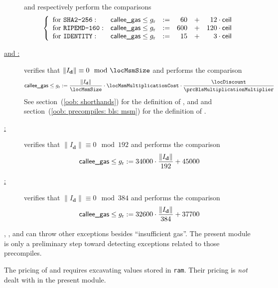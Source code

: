 \begin{description}
		and respectively perform the comparisons
		\[
			\left\{ \begin{array}{llcrcr}
				\text{for }\texttt{SHA2-256}   : & \textsf{callee\_gas} \leq g_\text{r} & := & 60  & + & 12  \cdot \textsf{ceil}  \\
				\text{for }\texttt{RIPEMD-160} : & \textsf{callee\_gas} \leq g_\text{r} & := & 600 & + & 120 \cdot \textsf{ceil}  \\
				\text{for }\texttt{IDENTITY}   : & \textsf{callee\_gas} \leq g_\text{r} & := & 15  & + & 3   \cdot \textsf{ceil}  \\
			\end{array} \right.
		\]
	\item[\underline{\inst{BLS12\_G1MSM} and \inst{BLS12\_G2MSM}:}]
		verifies that $\| I_\textbf{d} \| \equiv 0 \mod \locMsmSize$ and performs the comparison 
		\[ \locCalleeGas \leq g_\text{r} := \frac{\| I_\textbf{d} \|}{\locMsmSize} \cdot \locMsmMultiplicationCost \cdot \frac{\locDiscount}{\prcBlsMultiplicationMultiplier} \]
		See section~(\ref{oob: shorthands}) for the definition of \locMsmSize{}, \locMsmMultiplicationCost{} and \prcBlsMultiplicationMultiplier{} and section~(\ref{oob: precompiles: bls: msm}) for the definition of \locDiscount{}.
	\item[\underline{\inst{ECPAIRING}:}]
		verifies that $\| I_\textbf{d} \| \equiv 0 \mod 192$ and performs the comparison 
		\[ \textsf{callee\_gas} \leq g_\text{r} := 34000 \cdot \frac{\| I_\textbf{d} \|}{192} + 45000 \]
	\item[\underline{\inst{BLS12\_PAIRING\_CHECK}:}]
		verifies that $\| I_\textbf{d} \| \equiv 0 \mod 384$ and performs the comparison 
		\[ \textsf{callee\_gas} \leq g_\text{r} := 32600 \cdot \frac{\| I_\textbf{d} \|}{384} + 37700 \]
\end{description}

\saNote{}
, ,  and  can throw other exceptions besides ``insufficient gas''.
The present module is only a preliminary step toward detecting exceptions related to those precompiles.

\saNote{} The pricing of  and  requires excavating values stored in \texttt{ram}. Their pricing is \emph{not} dealt with in the present module. 

